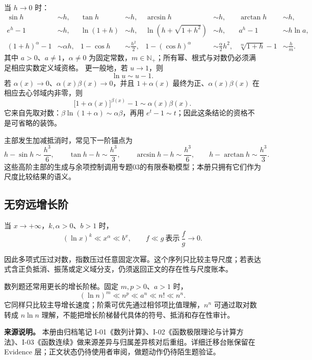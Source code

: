 \documentclass[11pt,a4paper]{ctexart}
\begin{document}
当 $h\to0$ 时：
\[
\begin{aligned}
\sin h&\sim h,& \tan h&\sim h,&
\arcsin h&\sim h,& \arctan h&\sim h,\\
e^h-1&\sim h,& \ln(1+h)&\sim h,&
\ln\!\left(h+\sqrt{1+h^2}\right)&\sim h,& a^h-1&\sim h\ln a,\\
{(1+h)}^\alpha-1&\sim \alpha h,&
1-\cos h&\sim \frac{h^2}{2},&
1-(\cos h)^\alpha&\sim \frac{\alpha}{2}h^2,&
\sqrt[m]{1+h}-1&\sim \frac{h}{m}.&&
\end{aligned}
\]
其中 $a>0$、$a\ne1$，$\alpha\ne0$ 为固定常数，$m\in\mathbb N_+$；所有幂、根式与对数仍必须满足相应实数定义域资格。
更一般地，若 $u\to1$，则
\[
\ln u\sim u-1.
\]
若 $\alpha(x)\to0$、$\alpha(x)\beta(x)\to0$，并且 $1+\alpha(x)$ 最终为正、$\alpha(x)\beta(x)$ 在相应去心邻域内非零，则
\[
\bigl[1+\alpha(x)\bigr]^{\beta(x)}-1\sim \alpha(x)\beta(x).
\]
它来自先取对数：$\beta\ln(1+\alpha)\sim\alpha\beta$，再用 $e^t-1\sim t$；因此这条结论的资格不是可省略的装饰。

主部发生加减抵消时，常见下一阶锚点为
\[
h-\sin h\sim\frac{h^3}{6},\qquad
\tan h-h\sim\frac{h^3}{3},\qquad
\arcsin h-h\sim\frac{h^3}{6},\qquad
h-\arctan h\sim\frac{h^3}{3}.
\]
这些高阶主部的生成与余项控制调用专题03的有限泰勒模型；本册只拥有它们作为尺度比较结果的语义。

\subsection{无穷远增长阶}

当 $x\to+\infty$，$k,\alpha>0$、$b>1$ 时，
\[
{(\ln x)}^k\ll x^\alpha\ll b^x,
\qquad f\ll g\ \text{表示}\ \frac{f}{g}\to0.
\]

因此多项式压过对数，指数压过任意固定次幂。这个序列只比较主导尺度；若表达式含正负抵消、振荡或定义域分支，仍须返回正文的存在性与尺度账本。

数列题还常用更长的增长阶梯。固定 $m,p>0$、$a>1$ 时，
\[
(\ln n)^m\ll n^p\ll a^n\ll n!\ll n^n.
\]
它同样只比较主导增长速度；阶乘可优先通过相邻项比值理解，$n^n$ 可通过取对数转成 $n\ln n$ 理解，不能把增长阶梯替代具体的符号、抵消和存在性审计。

\noindent\textbf{来源说明。} 本册由归档笔记 I-01《数列计算》、I-02《函数极限理论与计算方法》、I-03《函数连续》做来源差异与归属差异核对后重组。详细迁移台账保留在 Evidence 层；正文状态仍待使用者审阅，做题动作仍待陌生题验证。
\end{document}
